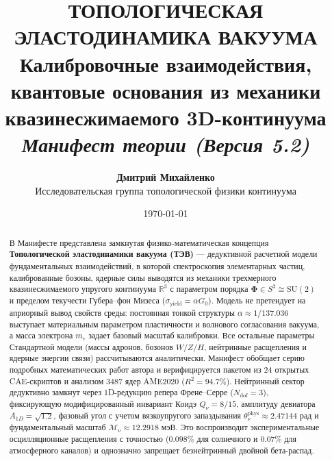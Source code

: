 \documentclass[11pt,a4paper]{article}
\theoremstyle{definition}
\theoremstyle{remark}
\begin{document}
\title{\textbf{\Large ТОПОЛОГИЧЕСКАЯ ЭЛАСТОДИНАМИКА ВАКУУМА}\\[2mm]
\large Калибровочные взаимодействия, квантовые основания из механики квазинесжимаемого 3D-континуума\\[2mm]
\normalsize \textit{Манифест теории (Версия 5.2)}}

\author{\textbf{Дмитрий Михайленко}\\[1mm]
\small Исследовательская группа топологической физики континуума}

\date{\today}

\maketitle

\begin{abstract}
\noindent В Манифесте представлена замкнутая физико-математическая концепция \textbf{Топологической эластодинамики вакуума (ТЭВ)} --- дедуктивной расчетной модели фундаментальных взаимодействий, в которой спектроскопия элементарных частиц, калиброванные бозоны, ядерные силы выводятся из механики трехмерного квазинесжимаемого упругого континуума $\mathbb{R}^3$ с параметром порядка $\boldsymbol{\Phi} \in S^3 \cong \mathrm{SU}(2)$ и пределом текучести Губера--фон Мизеса ($\sigma_{\mathrm{yield}} = \alpha G_0$).
\vspace{2mm}
\noindent Модель не претендует на априорный вывод свойств среды: постоянная тонкой структуры $\alpha \approx 1/137.036$ выступает материальным параметром пластичности и волнового согласования вакуума, а масса электрона $m_e$ задает базовый масштаб калибровки. Все остальные параметры Стандартной модели (массы адронов, бозонов $W/Z/H$, 
нейтринные расщепления и ядерные энергии связи) рассчитываются аналитически. Манифест обобщает серию подробных математических работ автора и верифицируется пакетом из 24 открытых CAE-скриптов и анализом 3487 ядер AME2020 ($R^2 = 94.7\%$).
Нейтринный сектор дедуктивно замкнут через 1D-редукцию репера Френе--Серре ($N_{\text{dof}} = 3$), 
фиксирующую модифицированный инвариант Коидэ $Q_\nu = 8/15$, амплитуду девиатора $A_{1D} = \sqrt{1.2}$, 
фазовый угол с учетом вязкоупругого запаздывания $\theta_\nu^{\text{phys}} \approx 2.47144$ рад 
и фундаментальный масштаб $\mathcal{M}_\nu \approx 12.2918$ мэВ. Это воспроизводит экспериментальные 
осцилляционные расщепления с точностью ($0.098\%$ для солнечного и $0.07\%$ для 
атмосферного каналов) и однозначно запрещает безнейтринный двойной бета-распад.
\end{abstract}
\end{document}
